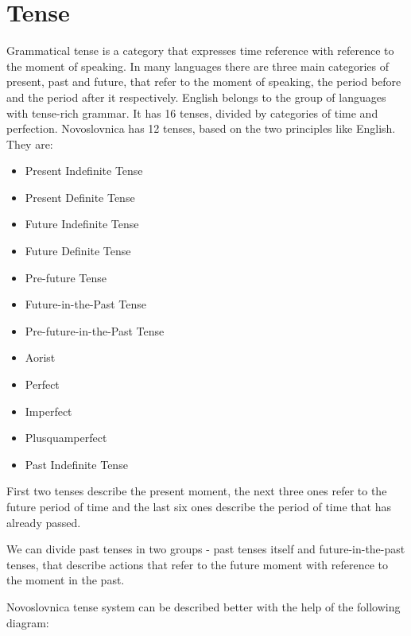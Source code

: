 \section{Tense}

Grammatical tense is a category that expresses time reference with reference to the moment of speaking. In many languages there are three main categories of present, past and future, that refer to the moment of speaking, the period before and the period after it respectively. English belongs to the group of languages with tense-rich grammar. It has 16 tenses, divided by categories of time and perfection. Novoslovnica has 12 tenses, based on the two principles like English. They are:

\begin{itemize}
	\item Present Indefinite Tense
	\item Present Definite Tense
	\item Future Indefinite Tense
	\item Future Definite Tense
	\item Pre-future Tense
	\item Future-in-the-Past Tense
	\item Pre-future-in-the-Past Tense
	\item Aorist
	\item Perfect
	\item Imperfect
	\item Plusquamperfect
	\item Past Indefinite Tense
\end{itemize}

First two tenses describe the present moment, the next three ones refer to the future period of time and the last six ones describe the period of time that has already passed.

We can divide past tenses in two groups - past tenses itself and future-in-the-past tenses, that describe actions that refer to the future moment with reference to the moment in the past.

Novoslovnica tense system can be described better with the help of the following diagram:

